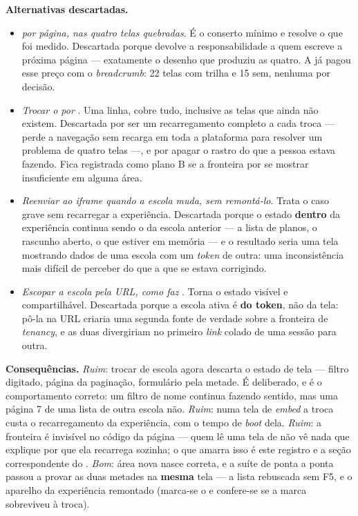 \textbf{Alternativas descartadas.}
\begin{itemize}
  \item \emph{ por página, nas quatro telas quebradas}. É o conserto
    mínimo e resolve o que foi medido. Descartada porque devolve a
    responsabilidade a quem escreve a próxima página --- exatamente o desenho
    que produziu as quatro. A  já pagou esse preço com o
    \emph{breadcrumb}: 22 telas com trilha e 15 sem, nenhuma por decisão.
  \item \emph{Trocar o  por }. Uma
    linha, cobre tudo, inclusive as telas que ainda não existem. Descartada por
    ser um recarregamento completo a cada troca --- perde a navegação sem
    recarga em toda a plataforma para resolver um problema de quatro telas ---,
    e por apagar o rastro do que a pessoa estava fazendo. Fica registrada como
    plano B se a fronteira por  se mostrar insuficiente em alguma área.
  \item \emph{Reenviar  ao \emph{iframe} quando a escola muda, sem
    remontá-lo}. Trata o caso grave sem recarregar a experiência. Descartada
    porque o estado \textbf{dentro} da experiência continua sendo o da escola
    anterior --- a lista de planos, o rascunho aberto, o que estiver em memória
    --- e o resultado seria uma tela mostrando dados de uma escola com um
    \emph{token} de outra: uma inconsistência mais difícil de perceber do que a
    que se estava corrigindo.
  \item \emph{Escopar a escola pela URL, como faz }. Torna o
    estado visível e compartilhável. Descartada porque a escola ativa é
    \textbf{do token}, não da tela: pô-la na URL criaria uma segunda fonte de
    verdade sobre a fronteira de \emph{tenancy}, e as duas divergiriam no
    primeiro \emph{link} colado de uma sessão para outra.
\end{itemize}

\textbf{Consequências.} \emph{Ruim}: trocar de escola agora descarta o estado de
tela --- filtro digitado, página da paginação, formulário pela metade. É
deliberado, e é o comportamento correto: um filtro de nome continua fazendo
sentido, mas uma página 7 de uma lista de outra escola não. \emph{Ruim}: numa
tela de \emph{embed} a troca custa o recarregamento da experiência, com o tempo
de \emph{boot} dela. \emph{Ruim}: a fronteira é invisível no código da página
--- quem lê uma tela de  não vê nada que explique por que ela
recarrega sozinha; o que amarra isso é este registro e a seção correspondente do
. \emph{Bom}: área nova nasce correta, e a suíte de
ponta a ponta passou a provar as duas metades na \textbf{mesma} tela --- a lista
rebuscada sem F5, e o aparelho da experiência remontado (marca-se o
 e confere-se se a marca sobreviveu à troca).

